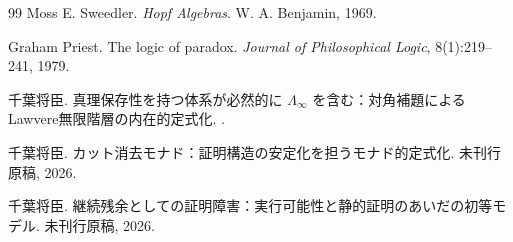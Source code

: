 \documentclass[11pt,a4paper]{ltjsarticle}
\theoremstyle{definition}
\begin{document}
\begin{thebibliography}{99}
Moss E. Sweedler.
\newblock \emph{Hopf Algebras}.
\newblock W. A. Benjamin, 1969.

Graham Priest.
\newblock The logic of paradox.
\newblock \emph{Journal of Philosophical Logic}, 8(1):219--241, 1979.

千葉将臣.
\newblock 真理保存性を持つ体系が必然的に $\Lambda_\infty$ を含む：対角補題によるLawvere無限階層の内在的定式化.
.

千葉将臣.
\newblock カット消去モナド：証明構造の安定化を担うモナド的定式化.
\newblock 未刊行原稿, 2026.

千葉将臣.
\newblock 継続残余としての証明障害：実行可能性と静的証明のあいだの初等モデル.
\newblock 未刊行原稿, 2026.

\end{thebibliography}
\end{document}
